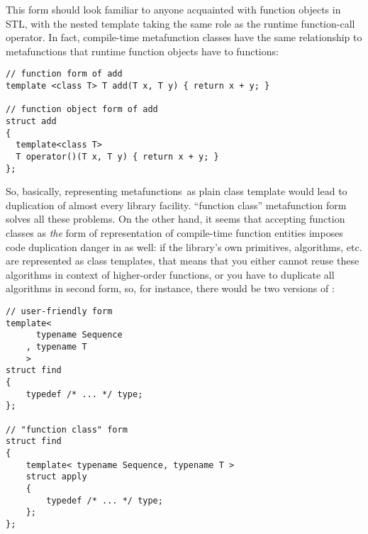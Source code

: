 \documentclass{kapproc}
\newcommand{\mfns}{meta\-func\-tions}
\begin{document}
This form should look familiar to anyone acquainted with function
objects in STL, with the nested  template taking the same
role as the runtime function-call operator. In fact, compile-time
metafunction classes have the same relationship to metafunctions that
runtime function objects have to functions:

{\small
\begin{codesamp}\begin{verbatim}
// function form of add
template <class T> T add(T x, T y) { return x + y; }

// function object form of add
struct add
{
  template<class T>
  T operator()(T x, T y) { return x + y; }
};
\end{verbatim}
\end{codesamp}
}




So, basically, representing \mfns\ as plain class 
template would lead to duplication of almost every library 
facility. ``function class'' metafunction form solves all these 
problems. On the other hand, it seems that accepting function 
classes as \emph{the} form of representation of compile-time 
function entities imposes code duplication danger in as well: 
if the library's own primitives, algorithms, etc. are 
represented as class templates, that means that you either 
cannot reuse these algorithms in context of higher-order 
functions, or you have to duplicate all algorithms in second 
form, so, for instance, there would be two versions of 
:

{\small
\begin{codesamp}\begin{verbatim}
// user-friendly form
template<
      typename Sequence
    , typename T
    >
struct find
{
    typedef /* ... */ type;
};

// "function class" form
struct find
{
    template< typename Sequence, typename T >
    struct apply
    {
        typedef /* ... */ type;
    };
};
\end{verbatim}
\end{codesamp}
}
\end{document}
